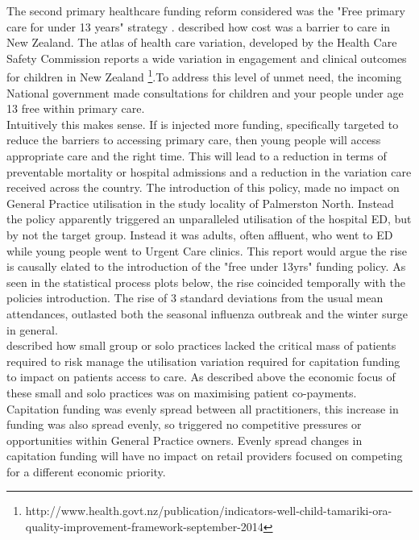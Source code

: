 \documentclass[11pt,a4paper]{article}
\begin{document}
The second primary healthcare funding reform considered was the "Free primary care for under 13 years" strategy \citep{frizelle2014health}. \citet{schoen2009survey} described how cost was a barrier to care in New Zealand. The atlas of health care variation, developed by the Health Care Safety Commission reports a wide variation in engagement and clinical outcomes for children in New Zealand \footnote{http://www.health.govt.nz/publication/indicators-well-child-tamariki-ora-quality-improvement-framework-september-2014}.To address this level of unmet need, the incoming National government made consultations for children and your people under age 13 free within primary care\citep{frizelle2014health}. \\

Intuitively this makes sense. If is injected more funding, specifically targeted to reduce the barriers to accessing primary care, then young people will access appropriate care and the right time. This will lead to a reduction in terms of preventable mortality or hospital admissions and a reduction in the variation care received across the country. The introduction of this policy, made no impact on General Practice utilisation in the study locality of Palmerston North. Instead the policy apparently triggered an unparalleled utilisation of the hospital ED, but by not the target group. Instead it was adults, often affluent, who went to ED while young people went to Urgent Care clinics. This report would argue the rise is causally elated to the introduction of the "free under 13yrs" funding policy. As seen in the statistical process plots below, the rise coincided temporally with the policies introduction. The rise of 3 standard deviations from the usual mean attendances, outlasted both the seasonal influenza outbreak and the winter surge in general.\\

\citet{howell2005restructuring} described how small group or solo practices lacked the critical mass of patients required to risk manage the utilisation variation required for capitation funding to impact on patients access to care. As described above the economic focus of these small and solo practices was on maximising patient co-payments. Capitation funding was evenly spread between all practitioners, this increase in funding was also spread evenly, so triggered no competitive pressures or opportunities within General Practice owners. Evenly spread changes in capitation funding will have no impact on retail providers focused on competing for a different economic priority.\\
\end{document}
